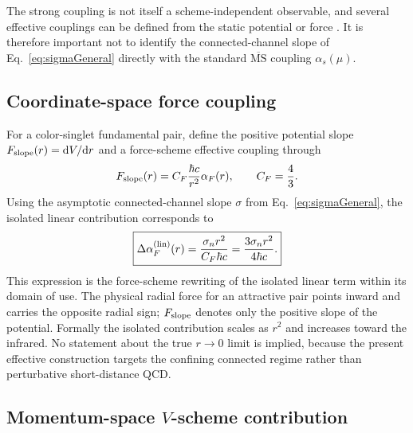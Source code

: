 \documentclass[10pt]{article}
\newcommand{\dd}{\mathrm{d}}
\newcommand{\MSbar}{\overline{\mathrm{MS}}}
\begin{document}
The strong coupling is not itself a scheme-independent observable, and several effective couplings can be defined from the static potential or force \cite{PDGQCD2025,Karbstein2018}.  It is therefore important not to identify the connected-channel slope of Eq.~\eqref{eq:sigmaGeneral} directly with the standard $\MSbar$ coupling $\alpha_s(\mu)$.

\subsection{Coordinate-space force coupling}

For a color-singlet fundamental pair, define the positive potential slope $F_{\rm slope}(r)=\dd V/\dd r$ and a force-scheme effective coupling through
\begin{equation}
F_{\rm slope}(r)=C_F\frac{\hbar c}{r^2}\alpha_F(r),
\qquad C_F=\frac{4}{3}.
\label{eq:alphaFdef}
\end{equation}
Using the asymptotic connected-channel slope $\sigma$ from Eq.~\eqref{eq:sigmaGeneral}, the isolated linear contribution corresponds to
\begin{equation}
\boxed{
\Delta\alpha_F^{(\rm lin)}(r)
=\frac{\sigma_n r^2}{C_F\hbar c}
=\frac{3\sigma_n r^2}{4\hbar c}.
}
\label{eq:alphaF}
\end{equation}
This expression is the force-scheme rewriting of the isolated linear term within its domain of use. The physical radial force for an attractive pair points inward and carries the opposite radial sign; $F_{\rm slope}$ denotes only the positive slope of the potential. Formally the isolated contribution scales as $r^2$ and increases toward the infrared. No statement about the true $r\to0$ limit is implied, because the present effective construction targets the confining connected regime rather than perturbative short-distance QCD.

\subsection{Momentum-space \texorpdfstring{$V$}{V}-scheme contribution}
\end{document}
